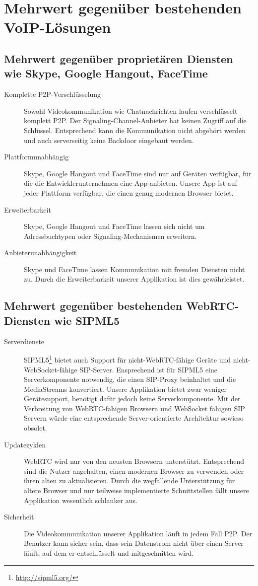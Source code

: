 		
	\section{Mehrwert gegenüber bestehenden VoIP-Lösungen}
		\subsection{Mehrwert gegenüber proprietären Diensten wie Skype, Google
		Hangout, FaceTime}
			\begin{description}
				\item[Komplette P2P-Verschlüsselung] Sowohl Videokommunikation wie
				Chatnachrichten laufen verschlüsselt komplett P2P. Der
				Signaling-Channel-Anbieter hat keinen Zugriff auf die Schlüssel.
				Entsprechend kann die Kommunikation nicht abgehört werden und auch
				serverseitig keine Backdoor eingebaut werden.
				\item[Plattformunabhängig] Skype, Google Hangout und FaceTime sind nur auf
				Geräten verfügbar, für die die Entwicklerunternehmen eine App anbieten.
				Unsere App ist auf jeder Plattform verfügbar, die einen genug modernen Browser bietet.
				\item[Erweiterbarkeit] Skype, Google Hangout und FaceTime lassen sich nicht
				um Adressbuchtypen oder Signaling-Mechanismen erweitern.
				\item[Anbieterunabhängigkeit] Skype und FaceTime lassen Kommunikation mit
				fremden Diensten nicht zu. Durch die Erweiterbarkeit unserer Applikation ist
				dies gewährleistet.
			\end{description}
		\subsection{Mehrwert gegenüber bestehenden WebRTC-Diensten wie SIPML5}
			\begin{description}
				\item[Serverdienste]
				SIPML5\footnote{\hyperlink{http://sipml5.org/}{http://sipml5.org/}} bietet
				auch Support für nicht-WebRTC-fähige Geräte und nicht-WebSocket-fähige
				SIP-Server. Ensprechend ist für SIPML5 eine Serverkomponente notwendig, die
				einen SIP-Proxy beinhaltet und die MediaStreams konvertiert. Unsere
				Applikation bietet zwar weniger Gerätesupport, benötigt dafür jedoch keine
				Serverkomponente. Mit der Verbreitung von WebRTC-fähigen Browsern und WebSocket fähigen SIP Servern würde eine entsprechende Server-orientierte Architektur sowieso obsolet.
				\item[Updatezyklen] WebRTC wird nur von den neusten Browsern unterstützt.
				Entsprechend sind die Nutzer angehalten, einen modernen Browser zu verwenden
				oder ihren alten zu aktualisieren. Durch die wegfallende Unterstützung für
				ältere Browser und nur teilweise implementierte Schnittstellen fällt unsere
				Applikation wesentlich schlanker aus.
				\item[Sicherheit] Die Videokommunikation unserer Applikation läuft in jedem
				Fall P2P. Der Benutzer kann sicher sein, dass sein Datenstrom nicht über einen Server läuft, auf dem er entschlüsselt und mitgeschnitten wird.
			\end{description}
